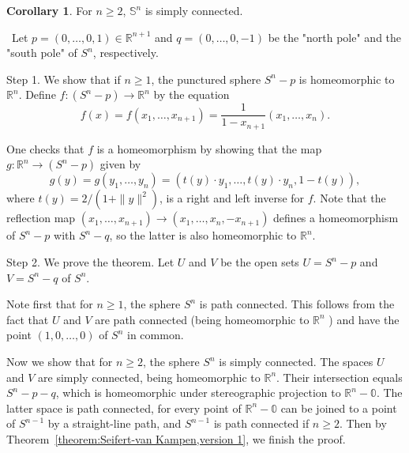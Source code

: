 \documentclass[12pt,a4paper]{book}
\newenvironment{prooff}{{\noindent\it\textcolor{cyan!40!black}{Proof}:}\,}{\par}
\newcommand{\bb}[1]{\mathbb{#1}}
\theoremstyle{definition}
\newtheorem{coro}[defn]{Corollary}
\begin{document}
\begin{coro}
    For $n\ge 2$, $\bb{S}^n$ is simply connected.
    \label{corollary:Sn is simply connect}
\end{coro}
\begin{prooff}
    Let $p=(0, \ldots, 0,1) \in \mathbb{R}^{n+1}$ and $q=(0, \ldots, 0,-1)$ be the "north pole" and the "south pole" of $S^n$, respectively.

    Step 1. We show that if $n \geq 1$, the punctured sphere $S^n-p$ is homeomorphic to $\mathbb{R}^n$.
    Define $f:\left(S^n-p\right) \rightarrow \mathbb{R}^n$ by the equation
    $$
        f(x)=f\left(x_1, \ldots, x_{n+1}\right)=\frac{1}{1-x_{n+1}}\left(x_1, \ldots, x_n\right) .
    $$

    One checks that $f$ is a homeomorphism by showing that the map $g: \mathbb{R}^n \rightarrow\left(S^n-p\right)$ given by
    $$
        g(y)=g\left(y_1, \ldots, y_n\right)=\left(t(y) \cdot y_1, \ldots, t(y) \cdot y_n, 1-t(y)\right),
    $$
    where $t(y)=2 /\left(1+\|y\|^2\right)$, is a right and left inverse for $f$.
    Note that the reflection map $\left(x_1, \ldots, x_{n+1}\right) \rightarrow\left(x_1, \ldots, x_n,-x_{n+1}\right)$ defines a homeomorphism of $S^n-p$ with $S^n-q$, so the latter is also homeomorphic to $\mathbb{R}^n$.

    Step 2. We prove the theorem. Let $U$ and $V$ be the open sets $U=S^n-p$ and $V=S^n-q$ of $S^n$.

    Note first that for $n \geq 1$, the sphere $S^n$ is path connected. This follows from the fact that $U$ and $V$ are path connected (being homeomorphic to $\mathbb{R}^n$ ) and have the point $(1,0, \ldots, 0)$ of $S^n$ in common.

    Now we show that for $n \geq 2$, the sphere $S^n$ is simply connected. The spaces $U$ and $V$ are simply connected, being homeomorphic to $\mathbb{R}^n$. Their intersection equals $S^n-p-q$, which is homeomorphic under stereographic projection to $\mathbb{R}^n-\mathbb{0}$. The latter space is path connected, for every point of $\mathbb{R}^n-\mathbb{0}$ can be joined to a point of $S^{n-1}$ by a straight-line path, and $S^{n-1}$ is path connected if $n \geq 2$.
    Then by Theorem~\ref{theorem:Seifert-van Kampen,version 1}, we finish the proof.
\end{prooff}
\end{document}
